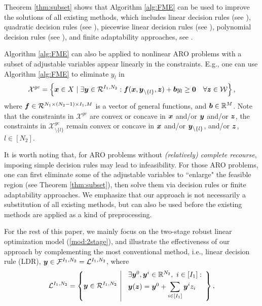 \documentclass[fleqn,isre,blindrev]{informs4}
\newcommand{\mb}[1]{\mbox{\boldmath \ensuremath{#1}}}
\begin{document}
 {Theorem \ref{thm:subset} shows that Algorithm \ref{alg:FME} can be used to improve the solutions of all existing methods, which includes linear decision rules (see \cite{bggn04,cz09}),  quadratic decision rules (see \cite{ben09}), piecewise linear decision rules (see \cite{cssz08,cz09,bg15}),  polynomial decision rules (see \cite{bip11}), and finite adaptability approaches, see \cite{bd16a,pd16}. 

Algorithm \ref{alg:FME} can also be applied to nonlinear ARO problems with a subset of adjustable variables appear linearly in the constraints. E.g., one can use Algorithm \ref{alg:FME} to eliminate $y_l$ in 
\begin{equation*}
	\mathcal{X}^{ge} = \left\{ \mb{x} \in X \hspace{3pt} | \hspace{3pt}  \exists \mb{y} \in \mathcal{R}^{I_1,N_2}: \mb{f}(\mb{x}, \mb{y}_{\setminus \{l\}}, \mb{z}) + \mb{b} y_l \geq \mb{0}  \quad  \forall \mb{z} \in \mathcal{W} \right\},
\end{equation*}
where $\mb{f} \in \mathcal{R}^{N_1\times (N_2-1)\times I_1, M}$ is a vector of general functions, and  $\mb{b} \in \mathbb{R}^{M}$. Note that the constraints in $\mathcal{X}^{ge}$ are convex or concave in $\mb{x}$ and/or $\mb{y}$ and/or $\mb{z}$, the constraints in $\mathcal{X}^{ge}_{\setminus \{l\}}$ remain convex or concave in $\mb{x}$ and/or $\mb{y}_{\setminus \{l\}}$, and/or $\mb{z}$, $l\in [N_2]$.  

 {It is worth noting that, for ARO problems without \textit{(relatively) complete recourse}, imposing simple decision rules may lead to infeasibility. For those ARO problems, one can first eliminate some of the adjustable variables to ``enlarge" the feasible region (see Theorem \ref{thm:subset}), then solve them via decision rules or finite adaptability approaches.} We emphasize that our approach is not necessarily a substitution of all existing methods, but can also be used before the existing methods are applied as a kind of preprocessing.}   For the rest of this paper, we mainly focus on the two-stage robust linear optimization model (\ref{mod:2stage}), and illustrate the effectiveness of our approach by complementing the most conventional method, i.e., linear decision rule (LDR), $\mb{y} \in \mathcal{F}^{I_1,N_2} = \mathcal{L}^{I_1,N_2}$, where
\begin{equation*}
\mathcal{L}^{I_1,N_2} =\left\{
\mb{y} \in \mathcal{R}^{I_1, N_2} \enskip \vline \enskip  \begin{array}{l}
\exists \mb{y}^0, \mb{y}^{i} \in \mathbb{R}^{N_2}, ~ i\in [I_1] :  \vspace{3pt}\\
\mb{y}(\mb{z}) = \mb{y}^0 + \displaystyle \sum_{i\in [I_1]}\mb{y}^{i} z_i \vspace{3pt}
\end{array}
\right\},
\end{equation*}
\end{document}
